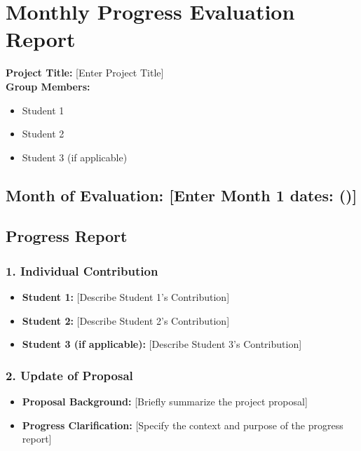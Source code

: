 
\appendix

\chapter{Monthly Progress Evaluation Report}


\textbf{Project Title:} [Enter Project Title] \\
\textbf{Group Members:}
\begin{itemize}
	\item Student 1
	\item Student 2
	\item Student 3 (if applicable)
\end{itemize}

\section*{Month of Evaluation: [Enter Month 1 dates: ()]}

\section*{Progress Report}

\subsection*{1. Individual Contribution}

\begin{itemize}
	\item \textbf{Student 1:} [Describe Student 1's Contribution]
	\item \textbf{Student 2:} [Describe Student 2's Contribution]
	\item \textbf{Student 3 (if applicable):} [Describe Student 3's Contribution]
\end{itemize}

\subsection*{2. Update of Proposal}

\begin{itemize}
	\item \textbf{Proposal Background:} [Briefly summarize the project proposal]
	\item \textbf{Progress Clarification:} [Specify the context and purpose of the progress report]
\end{itemize}

